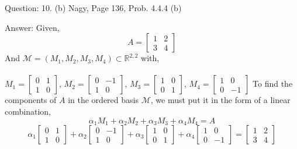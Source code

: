\documentclass[a4paper]{article}
\begin{document}
\begin{qalist}
		\item[Question: 10. (b) ] \setcounter{equation}{0} Nagy, Page 136, Prob. 4.4.4 (b)
		\item[Answer:] Given,
			\begin{equation}
				A = \begin{bmatrix}1 & 2 \\ 3 & 4\end{bmatrix}
			\end{equation}
			And $\mathcal{M} = ({M}_{1}, {M}_{2}, {M}_{3}, {M}_{4}) \subset  \mathbb{R}^{2,2}$ with, \\ \\
			${M}_{1} = \begin{bmatrix}0 & 1 \\ 1 & 0\end{bmatrix}$,	${M}_{2} = \begin{bmatrix}0 & -1 \\ 1 & 0\end{bmatrix}$,	${M}_{3} = \begin{bmatrix}1 & 0 \\ 0 & 1\end{bmatrix}$,	${M}_{4} = \begin{bmatrix}1 & 0 \\ 0 & -1\end{bmatrix}$ 
			To find the components of $A$ in the ordered basis $\mathcal{M}$, we must put it in the form of a linear combination, 
			\begin{equation}
				{\alpha}_{1}{M}_{1} + {\alpha}_{2}{M}_{2} + {\alpha}_{3}{M}_{3} + {\alpha}_{4}{M}_{4} = A
			\end{equation}
			\begin{equation}
				{\alpha}_{1}\begin{bmatrix}0 & 1 \\ 1 & 0\end{bmatrix} + {\alpha}_{2}\begin{bmatrix}0 & -1 \\ 1 & 0\end{bmatrix} + {\alpha}_{3}\begin{bmatrix}1 & 0 \\ 0 & 1\end{bmatrix} + {\alpha}_{4} \begin{bmatrix}1 & 0 \\ 0 & -1\end{bmatrix} = \begin{bmatrix}1 & 2 \\ 3 & 4\end{bmatrix}

\end{equation}
\end{qalist}
\end{document}
